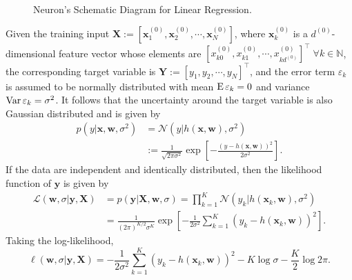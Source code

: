 \begin{figure}[!t]
\vspace{0.7cm}
\caption[Neuron's Schematic Diagram for Linear Regression]{Neuron's Schematic Diagram for Linear Regression.}
\label{fig:slrnn}
\end{figure}
Given the training input $\mathbf{X}:=[\mathbf{x}_1^{(0)},\mathbf{x}_2^{(0)},\cdots,\mathbf{x}_N^{(0)}]$, where $\mathbf{x}_k^{(0)}$ is a $d^{(0)}$-dimensional feature vector whose elements are $\left[x_{k0}^{(0)},x_{k1}^{(0)},\cdots, x_{kd^{(0)}}^{(0)}\right]^{\top}\;\forall k\in\mathbb{N}$, the corresponding target variable is $\mathbf{Y}:=[y_1,y_2,\cdots,y_N]^{\top}$, and the error term $\varepsilon_k$ is assumed to be normally distributed with mean $\operatorname{E}\varepsilon_k=0$ and variance $\operatorname{Var}\varepsilon_k=\sigma^2$. It follows that the uncertainty around the target variable is also Gaussian distributed and is given by
\begin{align}
p(y|\mathbf{x},\mathbf{w},\sigma^2)&=\mathcal{N}(y|h(\mathbf{x},\mathbf{w}),\sigma^2)\nonumber\\
&:=\frac{1}{\sqrt{2\pi\sigma^{2}}}\exp\left[-\frac{(y-h(\mathbf{x},\mathbf{w}))^2}{2\sigma^{2}}\right].
\end{align}
If the data are independent and identically distributed, then the likelihood function of $\mathbf{y}$ is given by
\begin{align}
\mathcal{L}(\mathbf{w},\sigma|\mathbf{y},\mathbf{X})&=p(\mathbf{y}|\mathbf{X},\mathbf{w},\sigma)=\prod_{k=1}^{K}\mathcal{N}(y_k|h(\mathbf{x}_k,\mathbf{w}),\sigma^2)\nonumber\\
&=\frac{1}{(2\pi)^{K/2}\sigma^K}\exp\left[-\frac{1}{2\sigma^2}\sum_{k=1}^{K}(y_k-h(\mathbf{x}_k,\mathbf{w}))^2\right].
\end{align}
Taking the log-likelihood,
\begin{equation}
\label{eq:mle}
\ell(\mathbf{w},\sigma|\mathbf{y},\mathbf{X})=-\frac{1}{2\sigma^2}\sum_{k=1}^K(y_k-h(\mathbf{x}_k,\mathbf{w}))^2-K\log\sigma-\frac{K}{2}\log 2\pi.
\end{equation}
